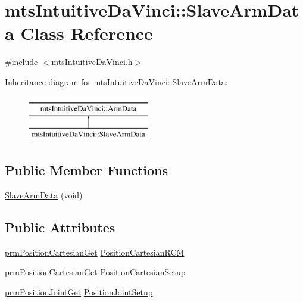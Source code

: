 \hypertarget{classmts_intuitive_da_vinci_1_1_slave_arm_data}{}\section{mts\+Intuitive\+Da\+Vinci\+:\+:Slave\+Arm\+Data Class Reference}
\label{classmts_intuitive_da_vinci_1_1_slave_arm_data}


{\ttfamily \#include $<$mts\+Intuitive\+Da\+Vinci.\+h$>$}

Inheritance diagram for mts\+Intuitive\+Da\+Vinci\+:\+:Slave\+Arm\+Data\+:\begin{figure}[H]
\begin{center}
\leavevmode
\includegraphics[height=2.000000cm]{d9/d02/classmts_intuitive_da_vinci_1_1_slave_arm_data}
\end{center}
\end{figure}
\subsection*{Public Member Functions}
\begin{DoxyCompactItemize}
\item 
\hyperlink{classmts_intuitive_da_vinci_1_1_slave_arm_data_a33819da9e042703dd661c07807e3c297}{Slave\+Arm\+Data} (void)
\end{DoxyCompactItemize}
\subsection*{Public Attributes}
\begin{DoxyCompactItemize}
\item 
\hyperlink{classprm_position_cartesian_get}{prm\+Position\+Cartesian\+Get} \hyperlink{classmts_intuitive_da_vinci_1_1_slave_arm_data_acbcd39e3197437403efb86bf908adbd5}{Position\+Cartesian\+R\+C\+M}
\item 
\hyperlink{classprm_position_cartesian_get}{prm\+Position\+Cartesian\+Get} \hyperlink{classmts_intuitive_da_vinci_1_1_slave_arm_data_a09a328a245e9ccf2d482941fba0c76bc}{Position\+Cartesian\+Setup}
\item 
\hyperlink{classprm_position_joint_get}{prm\+Position\+Joint\+Get} \hyperlink{classmts_intuitive_da_vinci_1_1_slave_arm_data_a9510d583a4decfbd25c027bf7c1e3e15}{Position\+Joint\+Setup}
\end{DoxyCompactItemize}


